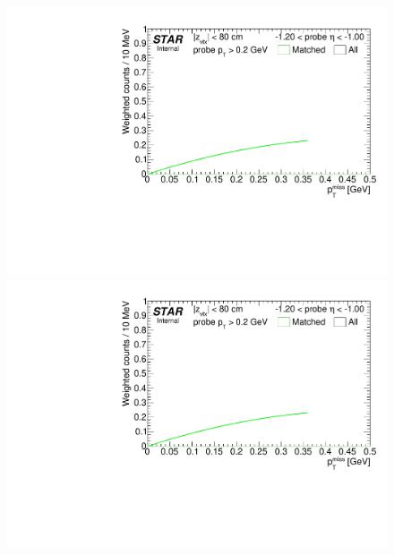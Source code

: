 \begin{figure}[ht]
{  \includegraphics[width=\linewidth,page=8]{graphics/systematicsEfficiency/TOF_tagAndProbe/Fitting_effVsEta_mc.CPT.pdf}\\
  \includegraphics[width=\linewidth,page=9]{graphics/systematicsEfficiency/TOF_tagAndProbe/Fitting_effVsEta_mc.CPT.pdf}\\
}%
\end{figure}
